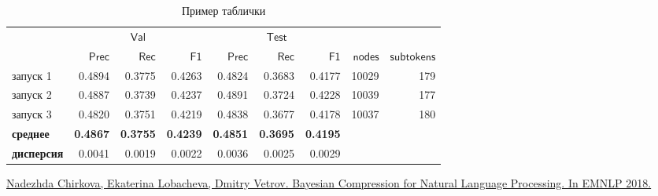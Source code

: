 \documentclass[a4paper,14pt]{extarticle}
\begin{document}
\begin{table}[htbp]
	\caption{Пример таблички}
	\label{table:long_epochs}
	\footnotesize
	\centering
	\begin{tabular}{lrrrrrrrr}
		\toprule
		& \multicolumn{3}{c}{$\mathsf{Val}$} &
		\multicolumn{3}{c}{$\mathsf{Test}$} \\
		\cmidrule(lr){2-4} \cmidrule(l){5-7} 
		{} &  $\mathsf{Prec}$ &  $\mathsf{Rec}$ &  $\mathsf{F1}$ &  $\mathsf{Prec}$ &  $\mathsf{Rec}$ &  $\mathsf{F1}$  &  $\mathsf{nodes}$ & $\mathsf{subtokens}$\\
		\midrule
		запуск 1    &    0.4894 &   0.3775 &  0.4263 &     0.4824 &    0.3683 &   0.4177 & 10029 & 179\\
		запуск 2    &    0.4887 &   0.3739 &  0.4237 &     0.4891 &    0.3724 &   0.4228 & 10039 & 177\\
		запуск 3    &    0.4820 &   0.3751 &  0.4219 &     0.4838 &    0.3677 &   0.4178 & 10037&	180\\
		\midrule
		\bf{среднее} &    \bf{0.4867} &   \bf{0.3755} &  \bf{0.4239} &    \bf{ 0.4851} &    \bf{0.3695} &   \bf{0.4195} \\
		\bf{дисперсия}  &    0.0041 &   0.0019 &  0.0022 &     0.0036 &    0.0025 &   0.0029 \\
		\bottomrule
	\end{tabular}
\end{table}

	
\newpage 


\begin{thebibliography}{0}
	\hypertarget{chirkova18}{}
	\href{https://arxiv.org/abs/1810.10927}
	{Nadezhda Chirkova, Ekaterina Lobacheva, Dmitry Vetrov. Bayesian Compression for Natural Language Processing. In EMNLP 2018.}
\end{thebibliography}
	
	
\end{document}
